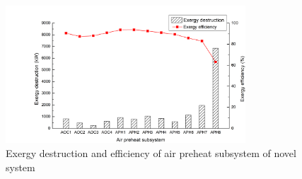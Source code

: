 \documentclass[preprint,12pt]{elsarticle}
\begin{document}
\begin{figure}[htbp]
\centering
\includegraphics[width=0.8\textwidth]{fig/novel_APH_exergy.png}
\caption{Exergy destruction and efficiency of air preheat subsystem of novel system} %
\label{fig:novel_APH_exergy}
\end{figure}

\end{document}

